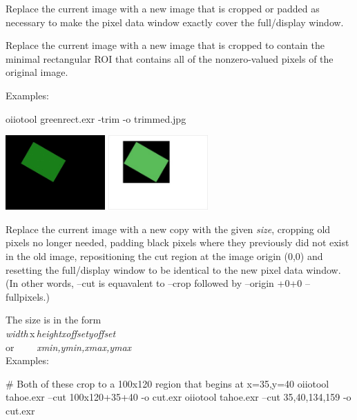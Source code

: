 Replace the current image with a new image that is cropped or padded
as necessary to make the pixel data window exactly cover
the full/display window.
\apiend

Replace the current image with a new image that is cropped to contain the
minimal rectangular ROI that contains all of the nonzero-valued pixels of
the original image.

\noindent Examples:

\begin{code}
    oiiotool greenrect.exr -trim -o trimmed.jpg
\end{code}
\hspace{0.4in} \includegraphics[width=1.5in]{figures/pretrim.jpg}
\raisebox{40pt}{\large $\rightarrow$}
 \includegraphics[width=1.5in]{figures/trim.jpg}
\apiend

Replace the current image with a new copy with the given \emph{size},
cropping old pixels no longer needed, padding black pixels where they
previously did not exist in the old image, repositioning the cut region
at the image origin (0,0) and resetting the full/display window to be
identical to the new pixel data window.  (In other words, {\cf --cut}
is equavalent to {\cf --crop} followed by {\cf --origin +0+0 --fullpixels}.)

The size is in the form 
\\ \spc\spc \emph{width}\,{\cf x}\,\emph{height}{\cf [+-]}\emph{xoffset}{\cf
  [+-]}\emph{yoffset}
\\ or~~~~ \spc \emph{xmin,ymin,xmax,ymax} \\

\noindent Examples:

\begin{code}
    # Both of these crop to a 100x120 region that begins at x=35,y=40
    oiiotool tahoe.exr --cut 100x120+35+40 -o cut.exr
    oiiotool tahoe.exr --cut 35,40,134,159 -o cut.exr
\end{code}

